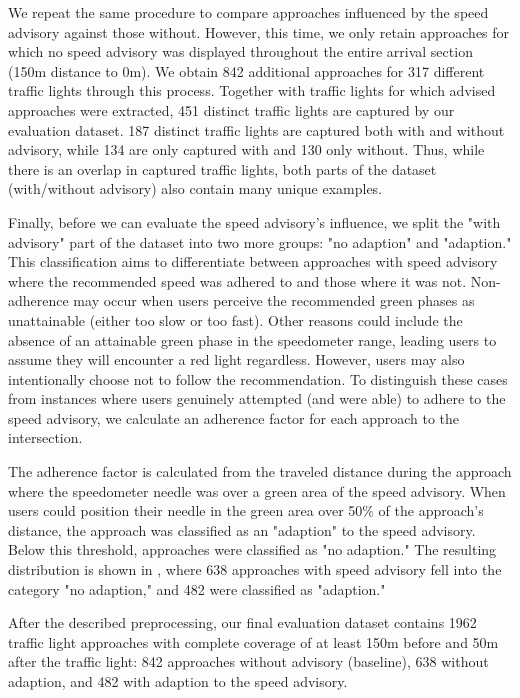 We repeat the same procedure to compare approaches influenced by the speed advisory against those without. However, this time, we only retain approaches for which no speed advisory was displayed throughout the entire arrival section (150m distance to 0m). We obtain 842 additional approaches for 317 different traffic lights through this process. Together with traffic lights for which advised approaches were extracted, 451 distinct traffic lights are captured by our evaluation dataset. 187 distinct traffic lights are captured both with and without advisory, while 134 are only captured with and 130 only without. Thus, while there is an overlap in captured traffic lights, both parts of the dataset (with/without advisory) also contain many unique examples.

Finally, before we can evaluate the speed advisory's influence, we split the "with advisory" part of the dataset into two more groups: "no adaption" and "adaption." This classification aims to differentiate between approaches with speed advisory where the recommended speed was adhered to and those where it was not. Non-adherence may occur when users perceive the recommended green phases as unattainable (either too slow or too fast). Other reasons could include the absence of an attainable green phase in the speedometer range, leading users to assume they will encounter a red light regardless. However, users may also intentionally choose not to follow the recommendation. To distinguish these cases from instances where users genuinely attempted (and were able) to adhere to the speed advisory, we calculate an adherence factor for each approach to the intersection.

The adherence factor is calculated from the traveled distance during the approach where the speedometer needle was over a green area of the speed advisory. When users could position their needle in the green area over 50\% of the approach's distance, the approach was classified as an "adaption" to the speed advisory. Below this threshold, approaches were classified as "no adaption." The resulting distribution is shown in , where 638 approaches with speed advisory fell into the category "no adaption," and 482 were classified as "adaption."

After the described preprocessing, our final evaluation dataset contains 1962 traffic light approaches with complete coverage of at least 150m before and 50m after the traffic light: 842 approaches without advisory (baseline), 638 without adaption, and 482 with adaption to the speed advisory.

